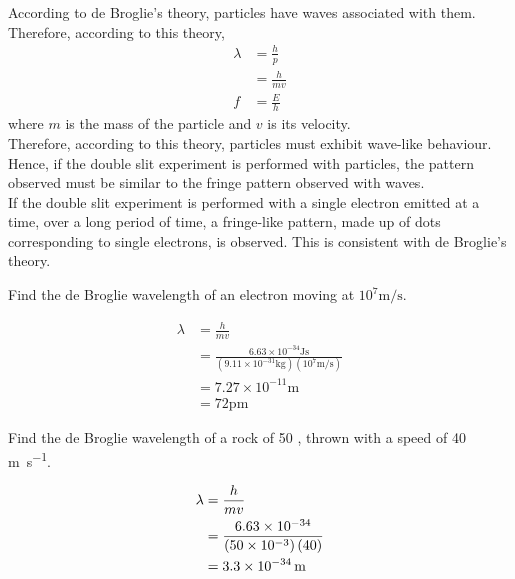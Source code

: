 \documentclass[titlepage, fleqn, a4paper, 12pt, twoside]{article}
\theoremstyle{definition}
\theoremstyle{theorem}
\begin{document}
According to de Broglie's theory, particles have waves associated with them.\\
Therefore, according to this theory,
\begin{align*}
	\lambda & = \frac{h}{p}   \\
                & = \frac{h}{m v} \\
	f       & = \frac{E}{h}
\end{align*}
where $m$ is the mass of the particle and $v$ is its velocity.\\
Therefore, according to this theory, particles must exhibit wave-like behaviour.
Hence, if the double slit experiment is performed with particles, the pattern observed must be similar to the fringe pattern observed with waves.\\
If the double slit experiment is performed with a single electron emitted at a time, over a long period of time, a fringe-like pattern, made up of dots corresponding to single electrons, is observed.
This is consistent with de Broglie's theory.

\begin{question}
	Find the de Broglie wavelength of an electron moving at $10^7 \si{\metre\per\second}$.
\end{question}

\begin{solution}
	\begin{align*}
		\lambda & = \frac{h}{m v}                                                                                                                                 \\
                        & = \frac{6.63 \times 10^{-34} \si{\joule\second}}{\left( 9.11 \times 10^{-31} \si{\kilogram} \right) \left( 10^7 \si{\metre\per\second} \right)} \\
                        & = 7.27 \times 10^{-11} \si{\metre}                                                                                                              \\
                        & = 72 \si{\pico\metre}
	\end{align*}
\end{solution}

\begin{question}
	Find the de Broglie wavelength of a rock of 50 \gram, thrown with a speed of 40 \si{\metre\per\second}.
\end{question}

\begin{solution}
	\begin{align*}
		\lambda & = \frac{h}{m v}                                                                   \\
                        & = \frac{6.63 \times 10^{-34}}{\left( 50 \times 10^{-3} \right) \left( 40 \right)} \\
                        & = 3.3 \times 10^{-34} \metre
	\end{align*}
\end{solution}
\end{document}
